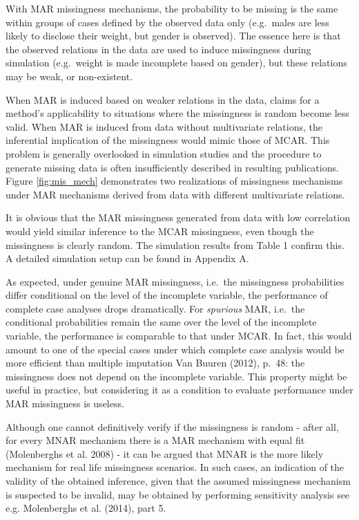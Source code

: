 \documentclass[
]{article}
\begin{document}
With MAR missingness mechanisms, the probability to be missing is the
same within groups of cases defined by the observed data only
(e.g.~males are less likely to disclose their weight, but gender is
observed). The essence here is that the observed relations in the data
are used to induce missingness during simulation (e.g.~weight is made
incomplete based on gender), but these relations may be weak, or
non-existent.

When MAR is induced based on weaker relations in the data, claims for a
method's applicability to situations where the missingness is random
become less valid. When MAR is induced from data without multivariate
relations, the inferential implication of the missingness would mimic
those of MCAR. This problem is generally overlooked in simulation
studies and the procedure to generate missing data is often
insufficiently described in resulting publications. Figure
\ref{fig:mis_mech} demonstrates two realizations of missingness
mechanisms under MAR mechanisms derived from data with different
multivariate relations.

It is obvious that the MAR missingness generated from data with low
correlation would yield similar inference to the MCAR missingness, even
though the missingness is clearly random. The simulation results from
Table 1 confirm this. A detailed simulation setup can be found in
Appendix A.

As expected, under genuine MAR missingness, i.e.~the missingness
probabilities differ conditional on the level of the incomplete
variable, the performance of complete case analyses drops dramatically.
For \emph{spurious} MAR, i.e.~the conditional probabilities remain the
same over the level of the incomplete variable, the performance is
comparable to that under MCAR. In fact, this would amount to one of the
special cases under which complete case analysis would be more efficient
than multiple imputation Van Buuren (2012), p.~48: the missingness does
not depend on the incomplete variable. This property might be useful in
practice, but considering it as a condition to evaluate performance
under MAR missingness is useless.

Although one cannot definitively verify if the missingness is random -
after all, for every MNAR mechanism there is a MAR mechanism with equal
fit (Molenberghs et al. 2008) - it can be argued that MNAR is the more
likely mechanism for real life missingness scenarios. In such cases, an
indication of the validity of the obtained inference, given that the
assumed missingness mechanism is suspected to be invalid, may be
obtained by performing sensitivity analysis see e.g. Molenberghs et al.
(2014), part 5.
\end{document}
